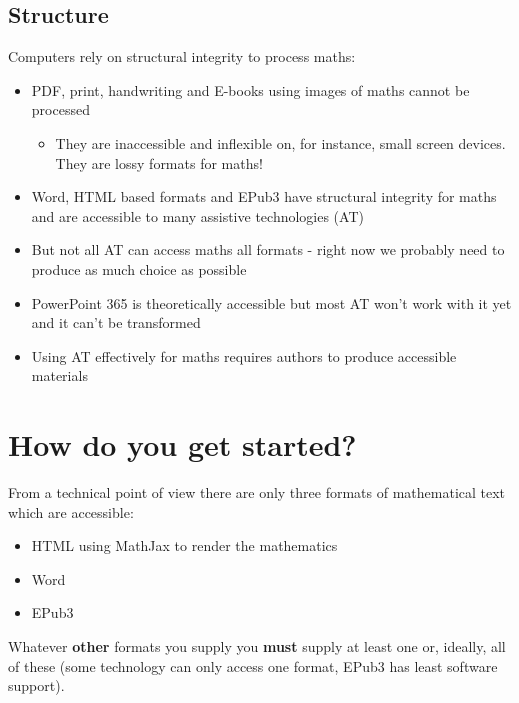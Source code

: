 \documentclass[
  10pt,
  english,
  a4paper]{article}
\providecommand{\tightlist}{%
  \setlength{\itemsep}{0pt}\setlength{\parskip}{0pt}}
\theoremstyle{plain}
\theoremstyle{plain}
\theoremstyle{plain}
\theoremstyle{plain}
\theoremstyle{plain}
\theoremstyle{definition}
\theoremstyle{definition}
\theoremstyle{definition}
\theoremstyle{remark}
\begin{document}
\hypertarget{structure}{%
\subsection{Structure}\label{structure}}

Computers rely on structural integrity to process maths:

\begin{itemize}
\tightlist
\item
  PDF, print, handwriting and E-books using images of maths cannot be processed

  \begin{itemize}
  \tightlist
  \item
    They are inaccessible and inflexible on, for instance, small screen devices. They are lossy formats for maths!
  \end{itemize}
\item
  Word, HTML based formats and EPub3 have structural integrity for maths and are accessible to many assistive technologies (AT)
\item
  But not all AT can access maths all formats - right now we probably need to produce as much choice as possible
\item
  PowerPoint 365 is theoretically accessible but most AT won't work with it yet and it can't be transformed
\item
  Using AT effectively for maths requires authors to produce accessible materials
\end{itemize}

\hypertarget{how-do-you-get-started}{%
\section{How do you get started?}\label{how-do-you-get-started}}

From a technical point of view there are only three formats of mathematical text which are accessible:

\begin{itemize}
\tightlist
\item
  HTML using MathJax to render the mathematics
\item
  Word
\item
  EPub3
\end{itemize}

Whatever \textbf{other} formats you supply you \textbf{must} supply at least one or, ideally, all of these (some technology can only access one format, EPub3 has least software support).
\end{document}
